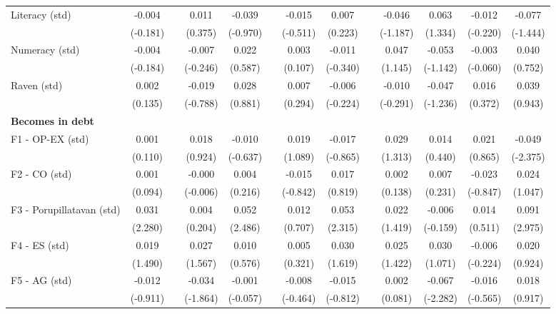 \begin{table}[htbp]
{\begin{tabular}{lcccccccccccc}
    Literacy (std) & -0.004 &   & 0.011 & -0.039 &   & -0.015 & 0.007 &   & -0.046 & 0.063 & -0.012 & -0.077 \\
      & (-0.181) &   & (0.375) & (-0.970) &   & (-0.511) & (0.223) &   & (-1.187) & (1.334) & (-0.220) & (-1.444) \\
    Numeracy (std) & -0.004 &   & -0.007 & 0.022 &   & 0.003 & -0.011 &   & 0.047 & -0.053 & -0.003 & 0.040 \\
      & (-0.184) &   & (-0.246) & (0.587) &   & (0.107) & (-0.340) &   & (1.145) & (-1.142) & (-0.060) & (0.752) \\
    Raven (std) & 0.002 &   & -0.019 & 0.028 &   & 0.007 & -0.006 &   & -0.010 & -0.047 & 0.016 & 0.039 \\
      & (0.135) &   & (-0.788) & (0.881) &   & (0.294) & (-0.224) &   & (-0.291) & (-1.236) & (0.372) & (0.943) \\
    \midrule
    \textbf{Becomes in debt} &       &       &       &       &       &       &       &       &       &       &       &  \\
    F1 - OP-EX (std) & 0.001 &   & 0.018 & -0.010 &   & 0.019 & -0.017 &   & 0.029 & 0.014 & 0.021 & -0.049 \\
      & (0.110) &   & (0.924) & (-0.637) &   & (1.089) & (-0.865) &   & (1.313) & (0.440) & (0.865) & (-2.375) \\
    F2 - CO (std) & 0.001 &   & -0.000 & 0.004 &   & -0.015 & 0.017 &   & 0.002 & 0.007 & -0.023 & 0.024 \\
      & (0.094) &   & (-0.006) & (0.216) &   & (-0.842) & (0.819) &   & (0.138) & (0.231) & (-0.847) & (1.047) \\
    F3 - Porupillatavan (std) & 0.031 &   & 0.004 & 0.052 &   & 0.012 & 0.053 &   & 0.022 & -0.006 & 0.014 & 0.091 \\
      & (2.280) &   & (0.204) & (2.486) &   & (0.707) & (2.315) &   & (1.419) & (-0.159) & (0.511) & (2.975) \\
    F4 - ES (std) & 0.019 &   & 0.027 & 0.010 &   & 0.005 & 0.030 &   & 0.025 & 0.030 & -0.006 & 0.020 \\
      & (1.490) &   & (1.567) & (0.576) &   & (0.321) & (1.619) &   & (1.422) & (1.071) & (-0.224) & (0.924) \\
    F5 - AG (std) & -0.012 &   & -0.034 & -0.001 &   & -0.008 & -0.015 &   & 0.002 & -0.067 & -0.016 & 0.018 \\
      & (-0.911) &   & (-1.864) & (-0.057) &   & (-0.464) & (-0.812) &   & (0.081) & (-2.282) & (-0.565) & (0.917) \\

\end{tabular}}
\end{table}

